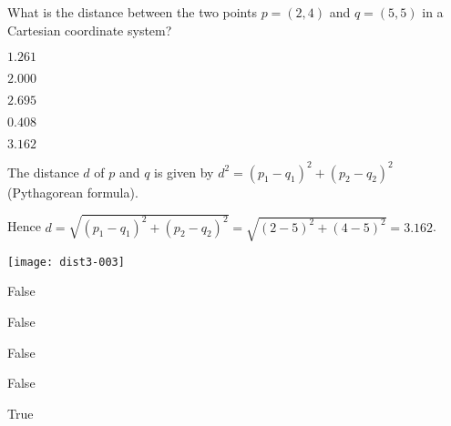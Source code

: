 
\begin{question}
What is the distance between the two points
$p = (2, 4)$ and $q = (5, 5)$
in a Cartesian coordinate system?

\begin{answerlist}
  \item $1.261$
  \item $2.000$
  \item $2.695$
  \item $0.408$
  \item $3.162$
\end{answerlist}\end{question}

\begin{solution}
The distance $d$ of $p$ and $q$ is given by
$d^2 = (p_1 - q_1)^2 + (p_2 - q_2)^2$ (Pythagorean formula).

Hence $d = \sqrt{(p_1 - q_1)^2 + (p_2 - q_2)^2} =
  \sqrt{(2 - 5)^2 + (4 - 5)^2}
   = 3.162$.

\texttt{[image: dist3-003]}

\begin{answerlist}
  \item False
  \item False
  \item False
  \item False
  \item True
\end{answerlist}\end{solution}

